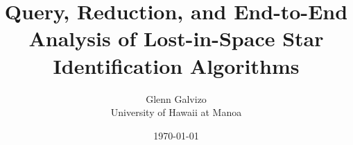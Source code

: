 \documentclass[conference]{IEEEtran}
\title{Query, Reduction, and End-to-End Analysis of Lost-in-Space Star Identification Algorithms}
\author{Glenn Galvizo \\ University of Hawaii at Manoa} \date{\today}
\begin{document}
    \maketitle

    
    
    
    
    
    
    

    \nocite{*}
    
    
\end{document}
